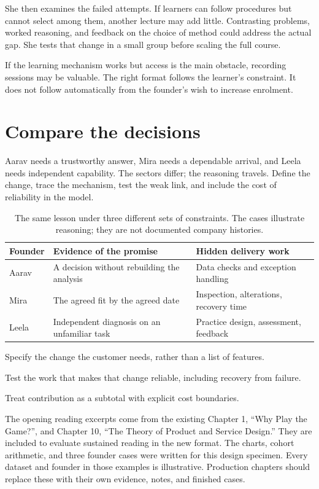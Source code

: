 \documentclass[11pt,twoside,openright]{book}
\begin{document}
She then examines the failed attempts. If learners can follow procedures but
cannot select among them, another lecture may add little. Contrasting problems,
worked reasoning, and feedback on the choice of method could address the actual
gap. She tests that change in a small group before scaling the full course.

If the learning mechanism works but access is the main obstacle, recording
sessions may be valuable. The right format follows the learner's constraint.
It does not follow automatically from the founder's wish to increase enrolment.

\clearpage
\section*{Compare the decisions}
Aarav needs a trustworthy answer, Mira needs a dependable arrival, and Leela
needs independent capability. The sectors differ; the reasoning travels.
Define the change, trace the mechanism, test the weak link, and include the
cost of reliability in the model.

\begin{table}[H]
\centering\small\sffamily
\begin{tabularx}{\linewidth}{@{}p{.72in}>{\raggedright\arraybackslash}X>{\raggedright\arraybackslash}X@{}}
\toprule
\textbf{Founder} & \textbf{Evidence of the promise} & \textbf{Hidden delivery work}\\
\midrule
Aarav & A decision without rebuilding the analysis & Data checks and exception handling\\
Mira & The agreed fit by the agreed date & Inspection, alterations, recovery time\\
Leela & Independent diagnosis on an unfamiliar task & Practice design, assessment, feedback\\
\bottomrule
\end{tabularx}
\caption{The same lesson under three different sets of constraints. The cases
illustrate reasoning; they are not documented company histories.}
\end{table}

\begin{LessonReview}
\item Specify the change the customer needs, rather than a list of features.
\item Test the work that makes that change reliable, including recovery from failure.
\item Treat contribution as a subtotal with explicit cost boundaries.
\end{LessonReview}

\NotesSection
The opening reading excerpts come from the existing Chapter 1, ``Why Play the
Game?'', and Chapter 10, ``The Theory of Product and Service Design.'' They are
included to evaluate sustained reading in the new format. The charts, cohort
arithmetic, and three founder cases were written for this design specimen.
Every dataset and founder in those examples is illustrative. Production
chapters should replace these with their own evidence, notes, and finished cases.
\end{document}
